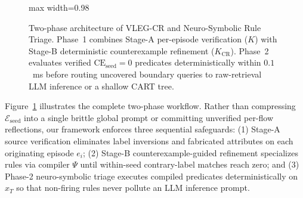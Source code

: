\documentclass[11pt,letterpaper,onecolumn]{article}
\begin{document}
\begin{figure}[tbp]
\begin{adjustbox}{max width=0.98\textwidth}
\end{adjustbox}
\caption{Two-phase architecture of VLEG-CR and Neuro-Symbolic Rule Triage. Phase~1 combines Stage-A per-episode verification ($K$) with Stage-B deterministic counterexample refinement ($K_{\mathrm{CR}}$). Phase~2 evaluates verified $\mathrm{CE}_{\mathrm{seed}}=0$ predicates deterministically within $0.1$~ms before routing uncovered boundary queries to raw-retrieval LLM inference or a shallow CART tree.}
\label{fig:architecture}
\end{figure}

Figure~\ref{fig:architecture} illustrates the complete two-phase workflow. Rather than compressing $\mathcal{E}_{\mathrm{seed}}$ into a single brittle global prompt or committing unverified per-flow reflections, our framework enforces three sequential safeguards: (1) Stage-A source verification eliminates label inversions and fabricated attributes on each originating episode $e_i$; (2) Stage-B counterexample-guided refinement specializes rules via compiler $\Psi$ until within-seed contrary-label matches reach zero; and (3) Phase-2 neuro-symbolic triage executes compiled predicates deterministically on $x_T$ so that non-firing rules never pollute an LLM inference prompt.
\end{document}
